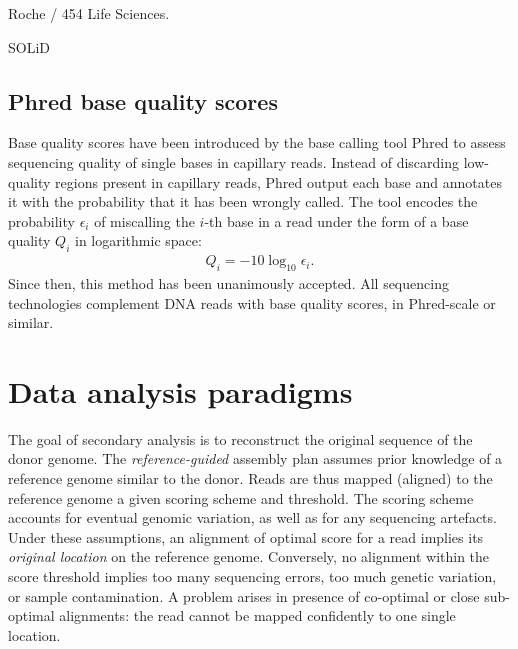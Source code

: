 Roche / 454 Life Sciences.

SOLiD

\subsection{Phred base quality scores}
\label{sec:background:hts:phred}

Base quality scores have been introduced by the base calling tool Phred \citep{Ewing1998, Ewing1998a} to assess sequencing quality of single bases in capillary reads.
Instead of discarding low-quality regions present in capillary reads, Phred output each base and annotates it with the probability that it has been wrongly called.
The tool encodes the probability $\epsilon_i$ of miscalling the $i$-th base in a read under the form of a base quality $Q_i$ in logarithmic space:
\begin{eqnarray}
\label{eq:phred}
Q_i = -10 \log_{10} \epsilon_i.
\end{eqnarray}
Since then, this method has been unanimously accepted.
All sequencing technologies complement DNA reads with base quality scores, in Phred-scale or similar.


\section{Data analysis paradigms}
\label{sec:paradigms}

The goal of secondary analysis is to reconstruct the original sequence of the donor genome.
The \emph{reference-guided} assembly plan assumes prior knowledge of a reference genome similar to the donor.
Reads are thus mapped (\ie aligned) to the reference genome \wrt a given scoring scheme and threshold.
The scoring scheme accounts for eventual genomic variation, as well as for any sequencing artefacts.
Under these assumptions, an alignment of optimal score for a read implies its \emph{original location} on the reference genome.
Conversely, no alignment within the score threshold implies too many sequencing errors, too much genetic variation, or sample contamination.
A problem arises in presence of co-optimal or close sub-optimal alignments: the read cannot be mapped confidently to one single location.

